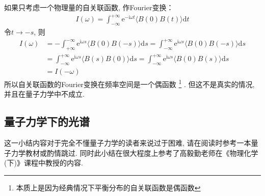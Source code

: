     如果只考虑一个物理量的自关联函数, 作Fourier变换：
    \begin{equation}\begin{aligned}
    I(\omega) = \int_{-\infty}^{+\infty} \mathrm{e}^{-\mathrm{i}\omega t} \langle B(0)B(t) \rangle \mathrm{d}t
    \end{aligned}\end{equation}
    令$t \to -s$, 则
    \begin{equation}\begin{aligned}
    I(\omega) 
    &= -\int_{+\infty}^{-\infty} \mathrm{e}^{\mathrm{i}\omega s} \langle B(0)B(-s) \rangle \mathrm{d}s
    =  \int_{-\infty}^{+\infty} \mathrm{e}^{\mathrm{i}\omega s} \langle B(0)B(-s) \rangle \mathrm{d}s\\
    &= \int_{-\infty}^{+\infty} \mathrm{e}^{\mathrm{i}\omega s} \langle B(s)B(0) \rangle \mathrm{d}s
    =  \int_{-\infty}^{+\infty} \mathrm{e}^{\mathrm{i}\omega s} \langle B(0)B(s) \rangle \mathrm{d}s\\
    &= I(-\omega)
    \end{aligned}\end{equation}
    所以自关联函数的Fourier变换在频率空间是一个偶函数
    \footnote{本质上是因为经典情况下平衡分布的自关联函数是偶函数}
    . 但这不是真实的情况, 并且在量子力学中不成立.

    \subsection{量子力学下的光谱}

    这一小结内容对于完全不懂量子力学的读者来说过于困难, 请在阅读时参考一本量子力学教材或酌情跳过. 
    同时此小结在很大程度上参考了高毅勤老师在《物理化学(下)》课程中教授的内容.

